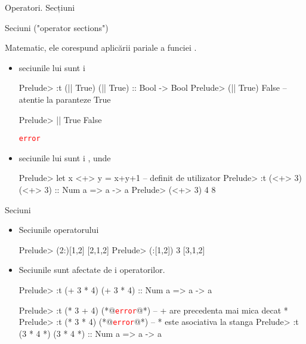 \documentclass[xcolor=pdftex,romanian,colorlinks]{beamer}
\begin{document}
\begin{section}{Operatori. Secțiuni}
\begin{frame}[fragile]{Sec\ts iuni ("operator sections")}
\begin{block}{}
   Matematic, ele corespund aplic\u arii par\ts iale a func\ts iei .
  \end{block}
  \begin{itemize}
  \item sec\ts iunile lui \structure{||} sunt
    \sh i 
  \begin{asciihs}
  Prelude> :t (|| True)
  (|| True) :: Bool -> Bool
  Prelude> (|| True) False  -- atentie la paranteze
  True
  \end{asciihs}
  \vspace*{-2ex}
   \begin{asciihs}
  Prelude> || True False
  \end{asciihs}
  \vspace*{-1.5ex}
  \textcolor{red}{\tt   error}
  \item sec\ts iunile lui \structure{<+>} sunt
    \sh i , unde
   \begin{asciihs}
  Prelude> let x <+> y = x+y+1  -- definit de utilizator
  Prelude> :t (<+> 3)
  (<+> 3) :: Num a => a -> a
  Prelude> (<+> 3) 4
  8
  \end{asciihs}
  
  \end{itemize}
  \end{frame}
  
  
  
  
  \begin{frame}[fragile]{Sec\ts iuni }
  \begin{itemize}
  \item Sec\ts iunile operatorului \structure{(:)}\pause
  \begin{asciihs}
  Prelude> (2:)[1,2]
  [2,1,2]
  Prelude> (:[1,2]) 3
  [3,1,2]
  \end{asciihs}
  
  \pause
  
  \item Sec\ts iunile sunt afectate de  \sh i  operatorilor.
  
  
  \begin{asciihs}
  Prelude> :t (+ 3 * 4)
  (+ 3 * 4) :: Num a => a -> a
  
  Prelude> :t (* 3 + 4)
  (*@\textcolor{red}{\tt error}@*) -- + are precedenta mai mica decat *
  Prelude> :t (* 3 * 4)
  (*@\textcolor{red}{\tt   error}@*)  -- * este asociativa la stanga
  Prelude> :t (3 * 4 *)
  (3 * 4 *) :: Num a => a -> a
  \end{asciihs}
  

\end{itemize}
\end{frame}
\end{section}
\end{document}
